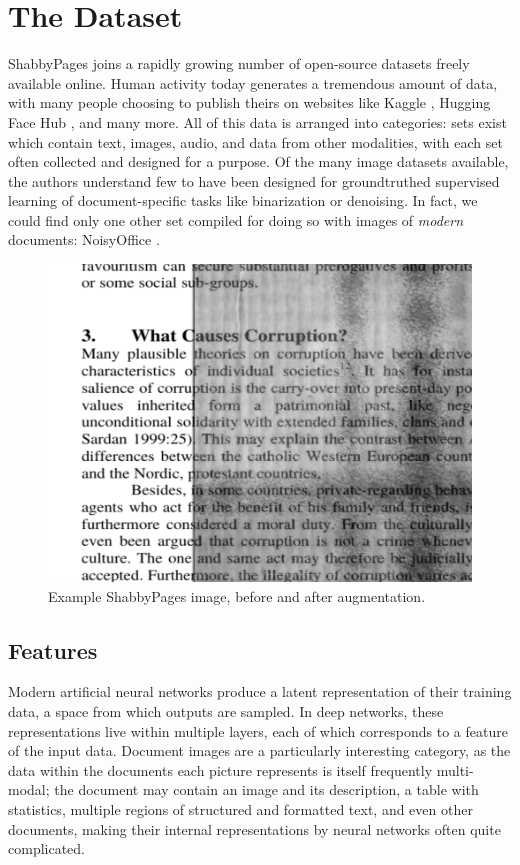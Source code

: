 \documentclass[runningheads]{llncs}
\begin{document}
\section{The Dataset}
ShabbyPages joins a rapidly growing number of open-source datasets freely available online. Human activity today generates a tremendous amount of data, with many people choosing to publish theirs on websites like Kaggle \cite{ref_Kaggle}, Hugging Face Hub \cite{ref_HuggingFaceHub}, and many more. All of this data is arranged into categories: sets exist which contain text, images, audio, and data from other modalities, with each set often collected and designed for a purpose. Of the many image datasets available, the authors understand few to have been designed for groundtruthed supervised learning of document-specific tasks like binarization or denoising. In fact, we could find only one other set compiled for doing so with images of \textit{modern} documents: NoisyOffice \cite{ref_NoisyOffice}.

\begin{figure}
\includegraphics[width=\textwidth]{Article_Hero_Picture_Shadow.png}
\caption{Example ShabbyPages image, before and after augmentation.} \label{fig1}
\end{figure}

\subsection{Features}
Modern artificial neural networks produce a latent representation of their training data, a space from which outputs are sampled. In deep networks, these representations live within multiple layers, each of which corresponds to a feature of the input data. Document images are a particularly interesting category, as the data within the documents each picture represents is itself frequently multi-modal; the document may contain an image and its description, a table with statistics, multiple regions of structured and formatted text, and even other documents, making their internal representations by neural networks often quite complicated.\\
\end{document}
